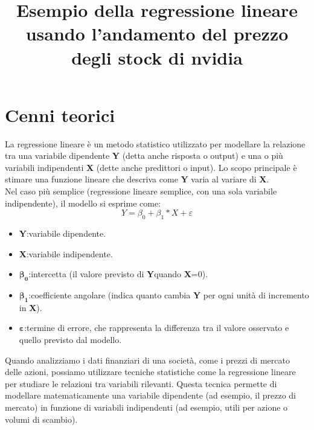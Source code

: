 \documentclass[11pt]{article}
\author{}
\date{}
\title{Esempio della regressione lineare usando l'andamento del prezzo degli stock di nvidia\vspace*{-3em}}
\begin{document}
\maketitle
\section*{Cenni teorici}
La regressione lineare è un metodo statistico utilizzato per modellare la relazione tra una variabile dipendente
\textbf{Y} (detta anche risposta o output) e una o più variabili indipendenti 
\textbf{X} (dette anche predittori o input). Lo scopo principale è stimare una funzione lineare che descriva come \textbf{Y} 
varia al variare di \textbf{X}.
\\Nel caso più semplice (regressione lineare semplice, con una sola variabile indipendente), il modello si esprime come:
\begin{equation}
    Y=\beta_0+\beta_1*X+\varepsilon  
\end{equation}
\begin{itemize}
    \item \textbf{Y}:variabile dipendente.
    \item \textbf{X}:variabile indipendente.
    \item \begin{math}\mathbf{\beta_0}\end{math}:intercetta (il valore previsto di \textbf{Y}quando \textbf{X}=0).
    \item \begin{math} \mathbf{\beta_1}\end{math}:coefficiente angolare (indica quanto cambia \textbf{Y} per ogni unità
          di incremento in \textbf{X}).
    \item \begin{math}\mathbf{\varepsilon}\end{math}:termine di errore, che rappresenta la differenza
          tra il valore osservato e quello previsto dal modello.       
\end{itemize}
Quando analizziamo i dati finanziari di una società, come i prezzi di mercato delle azioni, possiamo utilizzare tecniche statistiche come la regressione lineare per studiare 
le relazioni tra variabili rilevanti. Questa tecnica permette di modellare matematicamente una variabile 
dipendente (ad esempio, il prezzo di mercato) in funzione di variabili indipendenti (ad esempio, utili per azione o volumi di scambio).
\newpage
\end{document}
